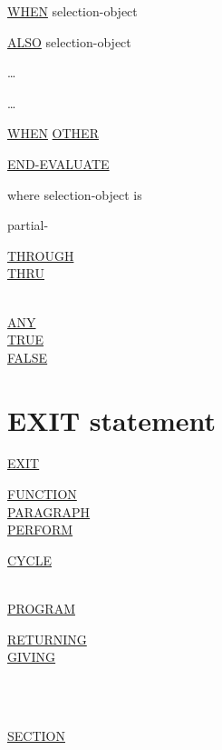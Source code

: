 \documentclass[a4paper,oneside,svgnames]{scrbook}
\makeatletter
\newcommand{\key}[1]{\underline{#1}}
\newcommand{\miscext}[1]{%
  \colorbox{blue!50}{#1}}
\newenvironment{0-1}{$\left[ \begin{tabular}{@{}l@{}}}{\end{tabular} \right]$}
\newenvironment{1=}{$\left\{ \begin{tabular}{@{}l@{}}}{\end{tabular} \right\}$}
\makeatother
\begin{document}
\begin{1=}
  \key{WHEN}
  selection-object
  \begin{0-1}
    \key{ALSO} selection-object
  \end{0-1}\ldots\ {}
  \imperativestatement
\end{1=} \ldots

\begin{0-1}
  \key{WHEN} \key{OTHER} \imperativestatement
\end{0-1}

\begin{0-1}
  \key{END-EVALUATE}
\end{0-1}

where selection-object is

\begin{1=}
  partial-\expression
  \begin{0-1}
    \begin{1=}
      \key{THROUGH} \\
      \key{THRU}
    \end{1=}
    \expression
  \end{0-1} \\

  \key{ANY} \\
  \key{TRUE} \\
  \key{FALSE}
\end{1=}

\section{EXIT statement}

\key{EXIT}
\begin{0-1}
  \key{FUNCTION} \\
  \key{PARAGRAPH} \\

  \key{PERFORM}
  \begin{0-1}
    \key{CYCLE}
  \end{0-1} \\

  \key{PROGRAM}
  \miscext{
    \begin{0-1}
      \begin{1=}
        \key{RETURNING} \\
        \key{GIVING}
      \end{1=}
    \end{0-1}
    \begin{1=}
      \identifier \\
      \literal
    \end{1=}
  } \\

  \key{SECTION} \\
\end{0-1}
\end{document}
